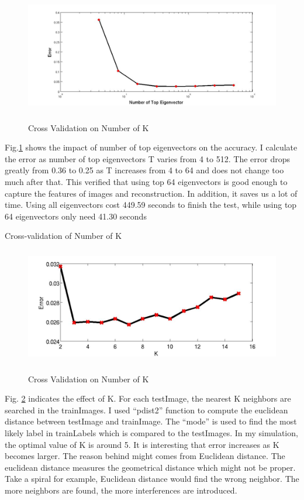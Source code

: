 \documentclass{article} %
\begin{document}
\begin{figure}[h]
\begin{center}
    \includegraphics[width=5.5in,height=2in]{./images/nTopEigenVector.png} \\
    \caption{Cross Validation on Number of K} 
    \label{44444}
\end{center}
\end{figure}

Fig.\ref{44444} shows the impact of number of top eigenvectors on the accuracy.  I
calculate  the error as number of top eigenvectors T varies from 4 to 512.
The error drops greatly from 0.36 to 0.25 as T increases from 4 to 64 and does
not change too much after that. This verified that using top 64 eigenvectors
is good enough to capture the features of images and reconstruction. In
addition, it saves us a lot of time. Using all eigenvectors cost 449.59
seconds to finish the test, while using top 64 eigenvectors only need 41.30
seconds

Cross-validation of Number of K

\begin{figure}[h]
\begin{center}
    \includegraphics[width=5.5in,height=2in]{./images/cvK.png} \\
    \caption{Cross Validation on Number of K} 
    \label{55555}
\end{center}
\end{figure}

Fig. \ref{55555} indicates the effect of K. For each testImage, the nearest K neighbors
are searched in the trainImages. I used “pdist2” function to compute the
euclidean distance between testImage and trainImage.  The “mode” is used to
find the most likely label in trainLabels which is compared to the testImages.
In my simulation, the optimal value of K is around 5. It is interesting that
error increases as K becomes larger. The reason behind might comes from
Euclidean distance. The euclidean distance measures the geometrical distance
which might not be proper. Take a spiral for example, Euclidean distance would
find the wrong neighbor.  The more neighbors are found, the more interferences
are introduced.
\end{document}
